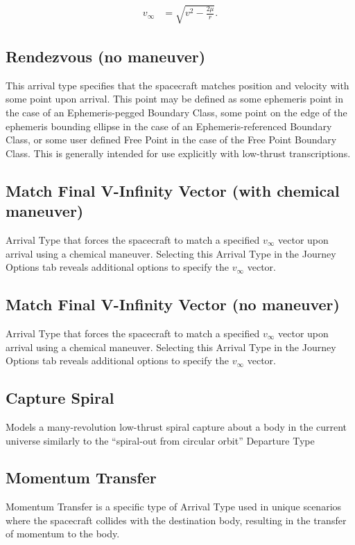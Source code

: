         \begin{align}
            v_{\infty} &= \sqrt{v^2 - \frac{2 \mu}{r}}.
        \end{align}

    \subsection{Rendezvous (no maneuver)}
    \label{sec:rendezvous_no_maneuver}
    This arrival type specifies that the spacecraft matches position and velocity with some point upon arrival. This point may be defined as some ephemeris point in the case of an Ephemeris-pegged Boundary Class, some point on the edge of the ephemeris bounding ellipse in the case of an Ephemeris-referenced Boundary Class, or some user defined Free Point in the case of the Free Point Boundary Class. This is generally intended for use explicitly with low-thrust transcriptions.

    \subsection{Match Final V-Infinity Vector (with chemical maneuver)}
    \label{sec:mathc_final_vinfty_vec_chemical_maneuver}
    Arrival Type that forces the spacecraft to match a specified $v_{\infty}$ vector upon arrival using a chemical maneuver. Selecting this Arrival Type in the Journey Options tab reveals additional options to specify the $v_{\infty}$ vector. %

    \subsection{Match Final V-Infinity Vector (no maneuver)}
    \label{sec:mathc_final_vinfty_vec_no_maneuver}
    Arrival Type that forces the spacecraft to match a specified $v_{\infty}$ vector upon arrival using a chemical maneuver. Selecting this Arrival Type in the Journey Options tab reveals additional options to specify the $v_{\infty}$ vector. %

    \subsection{Capture Spiral}
    \label{sec:capture_spiral}
    Models a many-revolution low-thrust spiral capture about a body in the current universe similarly to the ``spiral-out from circular orbit'' Departure Type

    \subsection{Momentum Transfer}
    \label{sec:momentum_transfer}
    Momentum Transfer is a specific type of Arrival Type used in unique scenarios where the spacecraft collides with the destination body, resulting in the transfer of momentum to the body.


